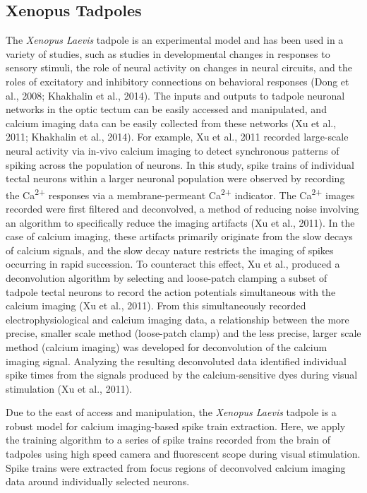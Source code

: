 \documentclass[11pt]{article}
\begin{document}
\subsection{Xenopus Tadpoles}
The \textit{Xenopus Laevis} tadpole is an experimental model and has been used in a variety of studies, such as studies in developmental changes in responses to sensory stimuli, the role of neural activity on changes in neural circuits, and the roles of excitatory and inhibitory connections on behavioral responses (Dong et al., 2008; Khakhalin et al., 2014).
The inputs and outputs to tadpole neuronal networks in the optic tectum can be easily accessed and manipulated, and calcium imaging data can be easily collected from these networks (Xu et al., 2011; Khakhalin et al., 2014). For example, Xu et al., 2011 recorded large-scale neural activity via in-vivo calcium imaging to detect synchronous patterns of spiking across the population of neurons. In this study, spike trains of individual tectal neurons within a larger neuronal population were observed by recording the Ca\textsuperscript{2+} responses via a membrane-permeant Ca\textsuperscript{2+} indicator. The Ca\textsuperscript{2+} images recorded were first filtered and deconvolved, a method of reducing noise involving an algorithm to specifically reduce the imaging artifacts (Xu et al., 2011). In the case of calcium imaging, these artifacts primarily originate from the slow decays of calcium signals, and the slow decay nature restricts the imaging of spikes occurring in rapid succession. To counteract this effect, Xu et al., produced a deconvolution algorithm by selecting and loose-patch clamping a subset of tadpole tectal neurons to record the action potentials simultaneous with the calcium imaging (Xu et al., 2011). From this simultaneously recorded electrophysiological and calcium imaging data, a relationship between the more precise, smaller scale method (loose-patch clamp) and the less precise, larger scale method (calcium imaging) was developed for deconvolution of the calcium imaging signal. Analyzing the resulting deconvoluted data identified individual spike times from the signals produced by the calcium-sensitive dyes during visual stimulation (Xu et al., 2011).\par
Due to the east of access and manipulation, the \textit{Xenopus Laevis} tadpole is a robust model for calcium imaging-based spike train extraction. Here, we apply the training algorithm to a series of spike trains recorded from the brain of tadpoles using high speed camera and fluorescent scope during visual stimulation. Spike trains were extracted from focus regions of deconvolved calcium imaging data around individually selected neurons.
\end{document}
